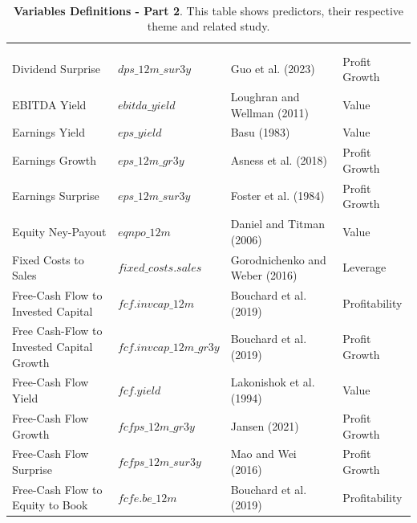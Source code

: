 \documentclass[preprint,12pt,authoryear]{elsarticle}
\begin{document}
\begin{appendices}
      \vspace{1em} %
\begin{table}[pt]
\captionsetup{
  justification=raggedright, %
  labelsep=none,
  singlelinecheck=false, %
  labelformat=boldlabel, %
}
\renewcommand{\arraystretch}{1.25}
\caption[Table 1: \footnotesize ]{\footnotesize \\ \textbf{Variables Definitions - Part 2}. This table shows predictors, their respective theme and related study.}  
\footnotesize %
\begin{tabularx}{\linewidth}{>{\raggedright\arraybackslash}m{3cm}>{\raggedright\arraybackslash}m{3.5cm}>{\raggedright\arraybackslash}m{4cm}>{\raggedright\arraybackslash}m{4cm}}
\hline
\multirow{2}{*}{Definition} & \multirow{2}{*}{Name} & \multirow{2}{*}{Citation} & \multirow{2}{*}{Cluster} \\
& & & \\
\hline
Dividend Surprise & $dps\_12m\_sur3y$ & Guo et al. (2023) & Profit Growth \\
EBITDA Yield & $ebitda\_yield$ & Loughran and Wellman (2011) & Value\\
Earnings Yield & $eps\_yield$ & Basu (1983) & Value\\
Earnings Growth & $eps\_12m\_gr3y$ & Asness et al. (2018) & Profit Growth\\
Earnings Surprise & $eps\_12m\_sur3y$ & Foster et al. (1984) & Profit Growth\\
Equity Ney-Payout & $eqnpo\_12m$ & Daniel and Titman (2006) & Value \\
Fixed Costs to Sales & $fixed\_costs.sales$ & Gorodnichenko and Weber (2016) & Leverage \\
Free-Cash Flow to Invested Capital & $fcf.invcap\_12m$ & Bouchard et al. (2019) & Profitability \\
Free Cash-Flow to Invested Capital Growth & $fcf.invcap\_12m\_gr3y$ &  Bouchard et al. (2019) & Profit Growth \\
Free-Cash Flow Yield & $fcf.yield$ & Lakonishok et al. (1994) & Value \\
Free-Cash Flow Growth & $fcfps\_12m\_gr3y$ & Jansen (2021) & Profit Growth \\
Free-Cash Flow Surprise & $fcfps\_12m\_sur3y$ &  Mao and Wei (2016) & Profit Growth \\
Free-Cash Flow to Equity to Book & $fcfe.be\_12m$ & Bouchard et al. (2019) & Profitability \\

\end{tabularx}
\end{table}
\end{appendices}
\end{document}
